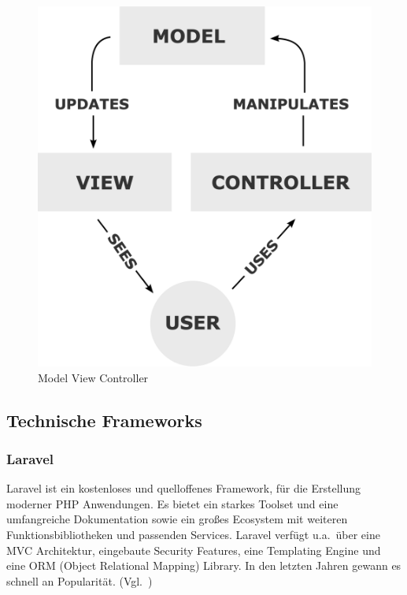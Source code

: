 \begin{figure}[h!]
    \centering
    \caption{Model View Controller}
    \label{fig:mvc}
    \includegraphics[scale=0.15]{assets/wikipedia_mvc_process}
\end{figure}

\newpage

\subsection{Technische Frameworks}

\subsubsection{Laravel}
Laravel ist ein kostenloses und quelloffenes Framework, für die Erstellung moderner PHP Anwendungen.
Es bietet ein starkes Toolset und eine umfangreiche Dokumentation sowie ein großes Ecosystem mit weiteren Funktionsbibliotheken und passenden Services.
Laravel verfügt u.a.\ über eine MVC Architektur, eingebaute Security Features, eine Templating Engine und eine ORM (Object Relational Mapping) Library.
In den letzten Jahren gewann es schnell an Popularität.
(Vgl.~\cite{what-is-laravel})

